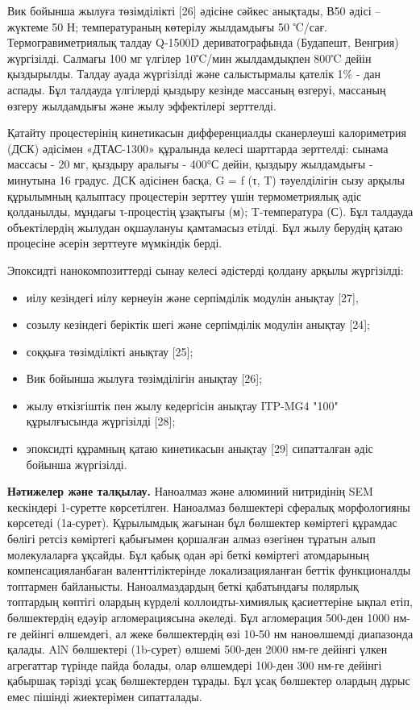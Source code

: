 \begin{multicols}{2}
Вик бойынша жылуға төзімділікті {[}26{]} әдісіне сәйкес анықтады, В50
әдісі -- жүктеме 50 Н; температураның көтерілу жылдамдығы 50 ℃/сағ.
Термогравиметриялық талдау Q-1500D дериватографында (Будапешт, Венгрия)
жүргізілді. Салмағы 100 мг үлгілер 10℃/мин жылдамдықпен 800℃ дейін
қыздырылды. Талдау ауада жүргізілді және салыстырмалы қателік 1\% - дан
аспады. Бұл талдауда үлгілерді қыздыру кезінде массаның өзгеруі,
массаның өзгеру жылдамдығы және жылу эффектілері зерттелді.

Қатайту процестерінің кинетикасын дифференциалды сканерлеуші
калориметрия (ДСК) әдісімен «ДТАС-1300» құралында келесі шарттарда
зерттелді: сынама массасы - 20 мг, қыздыру аралығы - 400°С дейін,
қыздыру жылдамдығы - минутына 16 градус. ДСК әдісінен басқа, G = f (τ,
T) тәуелділігін сызу арқылы құрылымның қалыптасу процестерін зерттеу
үшін термометриялық әдіс қолданылды, мұндағы τ-процестің ұзақтығы (м);
T-температура (С). Бұл талдауда объектілердің жылудан оқшаулануы
қамтамасыз етілді. Бұл жылу берудің қатаю процесіне әсерін зерттеуге
мүмкіндік берді.

Эпоксидті нанокомпозиттерді сынау келесі әдістерді қолдану арқылы
жүргізілді:

\begin{itemize}[leftmargin=*]
\item
  иілу кезіндегі иілу кернеуін және серпімділік модулін анықтау
  {[}27{]},
\item
  созылу кезіндегі беріктік шегі және серпімділік модулін анықтау
  {[}24{]};
\item
  соққыға төзімділікті анықтау {[}25{]};
\item
  Вик бойынша жылуға төзімділігін анықтау {[}26{]};
\item
  жылу өткізгіштік пен жылу кедергісін анықтау ITP-MG4 "100"
  құрылғысында жүргізілді {[}28{]};
\item
  эпоксидті құрамның қатаю кинетикасын анықтау {[}29{]} сипатталған әдіс
  бойынша жүргізілді.
\end{itemize}

{\bfseries Нәтижелер және талқылау.} Наноалмаз және алюминий нитридінің SEM
кескіндері 1-суретте көрсетілген. Наноалмаз бөлшектері сфералық
морфологияны көрсетеді (1а-сурет). Құрылымдық жағынан бұл бөлшектер
көміртегі құрамдас бөлігі ретсіз көміртегі қабығымен қоршалған алмаз
өзегінен тұратын алып молекулаларға ұқсайды. Бұл қабық одан әрі беткі
көміртегі атомдарының компенсацияланбаған валенттіліктерінде
локализацияланған беттік функционалды топтармен байланысты.
Наноалмаздардың беткі қабатындағы полярлық топтардың көптігі олардың
күрделі коллоидты-химиялық қасиеттеріне ықпал етіп, бөлшектердің едәуір
агломерациясына әкеледі. Бұл агломерация 500-ден 1000 нм-ге дейінгі
өлшемдегі, ал жеке бөлшектердің өзі 10-50 нм наноөлшемді диапазонда
қалады. AlN бөлшектері (1b-сурет) өлшемі 500-ден 2000 нм-ге дейінгі
үлкен агрегаттар түрінде пайда болады, олар өлшемдері 100-ден 300 нм-ге
дейінгі қабыршақ тәрізді ұсақ бөлшектерден тұрады. Бұл ұсақ бөлшектер
олардың дұрыс емес пішінді жиектерімен сипатталады.


\end{multicols}
